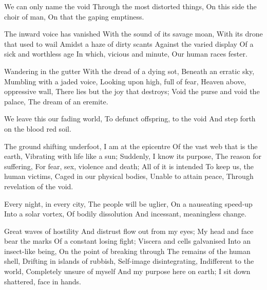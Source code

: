 \documentclass{article}
\newenvironment{stanza}{\begin{minipage}{10cm}\obeylines}{\end{minipage}\vspace{\baselineskip}}
\begin{document}
\begin{stanza}
We can only name the void
Through the most distorted things,
On this side the choir of man,
On that the gaping emptiness.
\end{stanza}


\begin{stanza}
The inward voice has vanished
With the sound of its savage moan,
With its drone that used to wail
Amidst a haze of dirty scants
Against the varied display
Of a sick and worthless age
In which, vicious and minute,
Our human races fester.
\end{stanza}

\begin{stanza}
Wandering in the gutter
With the dread of a dying sot,
Beneath an erratic sky,
Mumbling with a jaded voice,
Looking upon high, full of fear,
Heaven above, oppressive wall,
There lies but the joy that destroys;
Void the purse and void the palace,
The dream of an eremite.
\end{stanza}

\begin{stanza}
We leave this our fading world,
To defunct offspring, to the void
And step forth on the blood red soil.
\end{stanza}


\begin{stanza}
The ground shifting underfoot,
I am at the epicentre
Of the vast web that is the earth,
Vibrating with life like a sun;
Suddenly, I know its purpose,
The reason for suffering,
For fear, sex, violence and death;
All of it is intended
To keep us, the human victims,
Caged in our physical bodies,
Unable to attain peace,
Through revelation of the void.
\end{stanza}

\begin{stanza}
Every night, in every city,
The people will be uglier,
On a nauseating speed-up
Into a solar vortex,
Of bodily dissolution
And incessant, meaningless change.
\end{stanza}

\begin{stanza}
Great waves of hostility
And distrust flow out from my eyes;
My head and face bear the marks
Of a constant losing fight;
Viscera and cells galvanised
Into an insect-like being,
On the point of breaking through
The remains of the human shell,
Drifting in islands of rubbish,
Self-image disintegrating,
Indifferent to the world,
Completely unsure of myself
And my purpose here on earth;
I sit down shattered, face in hands.
\end{stanza}
\end{document}
